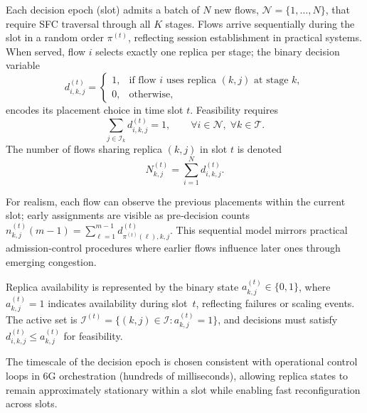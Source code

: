 \documentclass[journal]{IEEEtran}
\theoremstyle{plain}
\theoremstyle{definition}
\theoremstyle{remark}
\begin{document}
Each decision epoch (slot) admits a batch of $N$ new flows, $\mathcal{N}=\{1,\dots,N\}$, that require SFC traversal through all $K$ stages. Flows arrive sequentially during the slot in a random order $\pi^{(t)}$, reflecting session establishment in practical systems. When served, flow $i$ selects exactly one replica per stage; the binary decision variable
\begin{equation}
d^{(t)}_{i,k,j}=
\begin{cases}
1,& \text{if flow }i\text{ uses replica }(k,j)\text{ at stage }k,\\
0,& \text{otherwise,}
\end{cases}
\label{eq:decision_variable}
\end{equation}
encodes its placement choice in time slot $t$. Feasibility requires
\begin{equation}
\sum_{j\in\mathcal{I}_k} d^{(t)}_{i,k,j}=1,\qquad 
\forall i\in\mathcal{N},\; \forall k\in\mathcal{T}.
\label{eq:one_per_stage}
\end{equation}
The number of flows sharing replica $(k,j)$ in slot $t$ is denoted
\begin{equation}
N^{(t)}_{k,j}=\sum_{i=1}^{N} d^{(t)}_{i,k,j}.
\label{eq:replica_load}
\end{equation}

For realism, each flow can observe the previous placements within the current slot; early assignments are visible as pre‑decision counts
$n_{k,j}^{(t)}(m-1)=\sum_{\ell=1}^{m-1} d^{(t)}_{\pi^{(t)}(\ell),k,j}$.
This sequential model mirrors practical admission‑control procedures where earlier flows influence later ones through emerging congestion.

Replica availability is represented by the binary state $a_{k,j}^{(t)}\!\in\!\{0,1\}$, where $a_{k,j}^{(t)}\!=\!1$ indicates availability during slot~$t$, reflecting failures or scaling events. The active set is $\mathcal{I}^{(t)}=\{(k,j)\in\mathcal{I} : a_{k,j}^{(t)}=1\}$, and decisions must satisfy $d_{i,k,j}^{(t)}\!\le\! a_{k,j}^{(t)}$ for feasibility.

The timescale of the decision epoch is chosen consistent with operational control loops in 6G orchestration (hundreds of milliseconds), allowing replica states to remain approximately stationary within a slot while enabling fast reconfiguration across slots.
\end{document}
